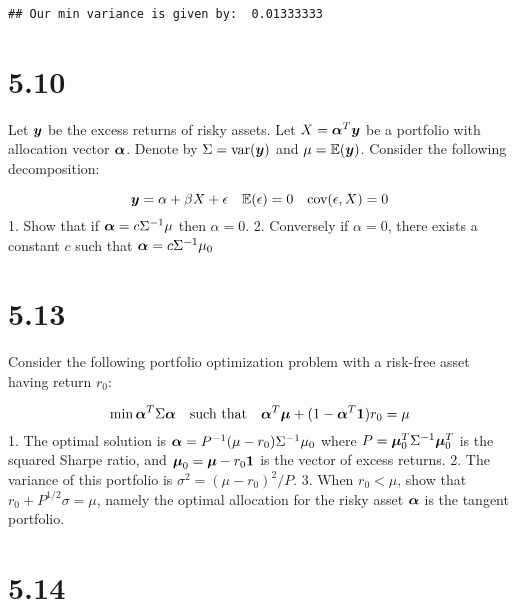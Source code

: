\documentclass[11pt,]{article}
\begin{document}
\begin{verbatim}
## Our min variance is given by:  0.01333333
\end{verbatim}

\hypertarget{section-2}{%
\section{5.10}\label{section-2}}

Let \({\bm{{\MakeLowercase{Y}}}}\) be the excess returns of risky
assets. Let
\(X = {\bm{{\MakeLowercase{\alpha}}}}^T{\bm{{\MakeLowercase{Y}}}}\) be a
portfolio with allocation vector \({\bm{{\MakeLowercase{\alpha}}}}\).
Denote by \(\Sigma = \text{var}({\bm{{\MakeLowercase{Y}}}})\) and
\(\mu = \mathbb{E}({\bm{{\MakeLowercase{Y}}}})\). Consider the following
decomposition:

\[
{\bm{{\MakeLowercase{Y}}}} = \alpha + \beta X + \epsilon \quad \mathbb{E}(\epsilon) = 0 \quad \text{cov}(\epsilon, X) = 0
\] 1. Show that if \({\bm{{\MakeLowercase{\alpha}}}} = c\Sigma^{-1}\mu\)
then \(\alpha =0\). 2. Conversely if \(\alpha = 0\), there exists a
constant \(c\) such that
\({\bm{{\MakeLowercase{\alpha}}}} = c\Sigma^{-1}\mu_0\)

\hypertarget{section-3}{%
\section{5.13}\label{section-3}}

Consider the following portfolio optimization problem with a risk-free
asset having return \(r_0\):

\[
\min{{\bm{{\MakeLowercase{\alpha}}}}^T \Sigma {\bm{{\MakeLowercase{\alpha}}}}} \quad \text{such that} \quad {\bm{{\MakeLowercase{\alpha}}}}^T {\bm{{\MakeLowercase{\mu}}}} + (1-{\bm{{\MakeLowercase{\alpha}}}}^T{\bm{{\MakeLowercase{1}}}}) r_0 = \mu
\] 1. The optimal solution is
\({\bm{{\MakeLowercase{\alpha}}}} = P^{-1} (\mu-r_0)\Sigma^{-1}\mu_0\)
where
\(P = {\bm{{\MakeLowercase{\mu}}}}_0^T \Sigma^{-1} {\bm{{\MakeLowercase{\mu}}}}_0^T\)
is the squared Sharpe ratio, and
\({\bm{{\MakeLowercase{\mu}}}}_0 = {\bm{{\MakeLowercase{\mu}}}}-r_0{\bm{{\MakeLowercase{1}}}}\)
is the vector of excess returns. 2. The variance of this portfolio is
\(\sigma^2 = (\mu - r_0)^2 / P\). 3. When \(r_0 < \mu\), show that
\(r_0 + P^{1/2} \sigma = \mu\), namely the optimal allocation for the
risky asset \({\bm{{\MakeLowercase{\alpha}}}}\) is the tangent
portfolio.

\hypertarget{section-4}{%
\section{5.14}\label{section-4}}
\end{document}
